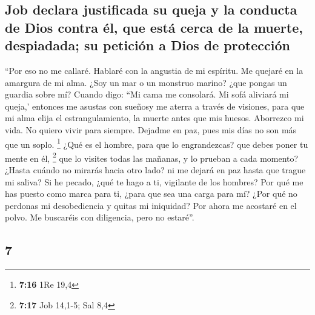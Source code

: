 \begin{paracol}{2}
\hypertarget{job-declara-justificada-su-queja-y-la-conducta-de-dios-contra-uxe9l-que-estuxe1-cerca-de-la-muerte-despiadada-su-peticiuxf3n-a-dios-de-protecciuxf3n}{%
\subsection{Job declara justificada su queja y la conducta de Dios
contra él, que está cerca de la muerte, despiadada; su petición a Dios
de
protección}\label{job-declara-justificada-su-queja-y-la-conducta-de-dios-contra-uxe9l-que-estuxe1-cerca-de-la-muerte-despiadada-su-peticiuxf3n-a-dios-de-protecciuxf3n}}

 ``Por eso no me callaré. Hablaré con la angustia de mi
espíritu. Me quejaré en la amargura de mi alma.  ¿Soy un
mar o un monstruo marino? ¿que pongas un guardia sobre mí?
 Cuando digo: ``Mi cama me consolará. Mi sofá aliviará mi
queja,'  entonces me asustas con sueñosy me aterra a
través de visiones,  para que mi alma elija el
estrangulamiento, la muerte antes que mis huesos. 
Aborrezco mi vida. No quiero vivir para siempre. Dejadme en paz, pues
mis días no son más que un soplo. \footnote{\textbf{7:16} 1Re 19,4}
 ¿Qué es el hombre, para que lo engrandezcas? que debes
poner tu mente en él, \footnote{\textbf{7:17} Job 14,1-5; Sal 8,4}
 que lo visites todas las mañanas, y lo prueban a cada
momento?  ¿Hasta cuándo no mirarás hacia otro lado? ni me
dejará en paz hasta que trague mi saliva?  Si he pecado,
¿qué te hago a ti, vigilante de los hombres? Por qué me has puesto como
marca para ti, ¿para que sea una carga para mí?  ¿Por qué
no perdonas mi desobediencia y quitas mi iniquidad? Por ahora me
acostaré en el polvo. Me buscaréis con diligencia, pero no estaré''.

\switchcolumn
\begin{otherlanguage}{english}

\hypertarget{section-13}{%
\section{7}\label{section-13}}


\end{otherlanguage}
\end{paracol}
